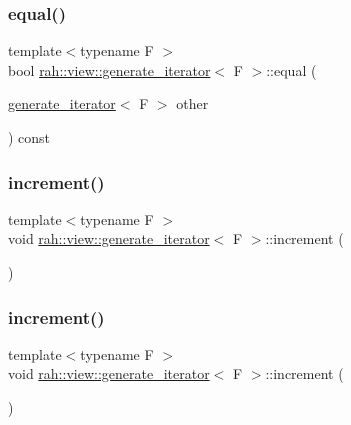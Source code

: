 \subsubsection{\texorpdfstring{equal()}{equal()}\hspace{0.1cm}{\footnotesize\ttfamily [2/2]}}
{\footnotesize\ttfamily template$<$typename F $>$ \\
bool \mbox{\hyperlink{structrah_1_1view_1_1generate__iterator}{rah\+::view\+::generate\+\_\+iterator}}$<$ F $>$\+::equal (\begin{DoxyParamCaption}\item[{\mbox{\hyperlink{structrah_1_1view_1_1generate__iterator}{generate\+\_\+iterator}}$<$ F $>$}]{other }\end{DoxyParamCaption}) const\hspace{0.3cm}{\ttfamily [inline]}}

\mbox{\label{structrah_1_1view_1_1generate__iterator_aeb0fc0db74bda811fe5d7cb8c6efe1e0}} 
\subsubsection{\texorpdfstring{increment()}{increment()}\hspace{0.1cm}{\footnotesize\ttfamily [1/2]}}
{\footnotesize\ttfamily template$<$typename F $>$ \\
void \mbox{\hyperlink{structrah_1_1view_1_1generate__iterator}{rah\+::view\+::generate\+\_\+iterator}}$<$ F $>$\+::increment (\begin{DoxyParamCaption}{ }\end{DoxyParamCaption})\hspace{0.3cm}{\ttfamily [inline]}}

\mbox{\label{structrah_1_1view_1_1generate__iterator_aeb0fc0db74bda811fe5d7cb8c6efe1e0}} 
\subsubsection{\texorpdfstring{increment()}{increment()}\hspace{0.1cm}{\footnotesize\ttfamily [2/2]}}
{\footnotesize\ttfamily template$<$typename F $>$ \\
void \mbox{\hyperlink{structrah_1_1view_1_1generate__iterator}{rah\+::view\+::generate\+\_\+iterator}}$<$ F $>$\+::increment (\begin{DoxyParamCaption}{ }\end{DoxyParamCaption})\hspace{0.3cm}{\ttfamily [inline]}}



